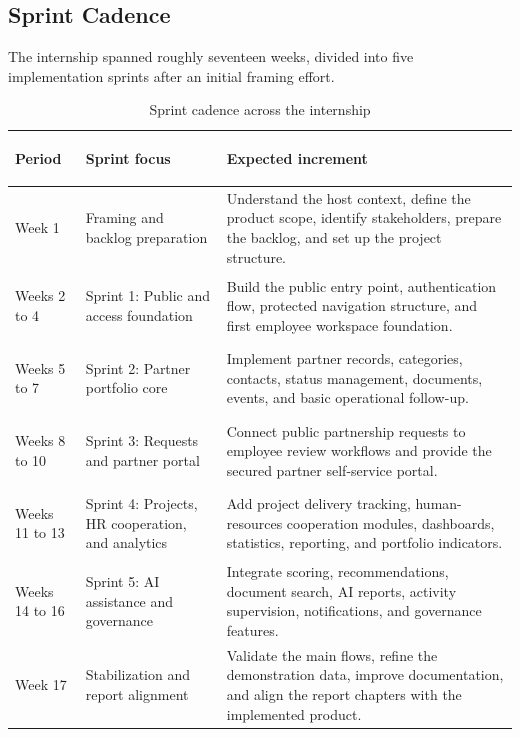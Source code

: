 \subsection{Sprint Cadence}
The internship spanned roughly seventeen weeks, divided into five implementation sprints after an initial framing effort.
\begin{table}[H]
  \centering
  \caption{Sprint cadence across the internship}
  \begin{tabularx}{\textwidth}{>{\bfseries\raggedright\arraybackslash}p{2.4cm}>{\raggedright\arraybackslash}p{3.2cm}X}
    \toprule
    Period & Sprint focus & Expected increment \\
    \midrule
    Week 1 & Framing and backlog preparation & Understand the host context, define the product scope, identify stakeholders, prepare the backlog, and set up the project structure. \\
    Weeks 2 to 4 & Sprint 1: Public and access foundation & Build the public entry point, authentication flow, protected navigation structure, and first employee workspace foundation. \\
    Weeks 5 to 7 & Sprint 2: Partner portfolio core & Implement partner records, categories, contacts, status management, documents, events, and basic operational follow-up. \\
    Weeks 8 to 10 & Sprint 3: Requests and partner portal & Connect public partnership requests to employee review workflows and provide the secured partner self-service portal. \\
    Weeks 11 to 13 & Sprint 4: Projects, HR cooperation, and analytics & Add project delivery tracking, human-resources cooperation modules, dashboards, statistics, reporting, and portfolio indicators. \\
    Weeks 14 to 16 & Sprint 5: AI assistance and governance & Integrate scoring, recommendations, document search, AI reports, activity supervision, notifications, and governance features. \\
    Week 17 & Stabilization and report alignment & Validate the main flows, refine the demonstration data, improve documentation, and align the report chapters with the implemented product. \\
    \bottomrule
  \end{tabularx}
\end{table}
